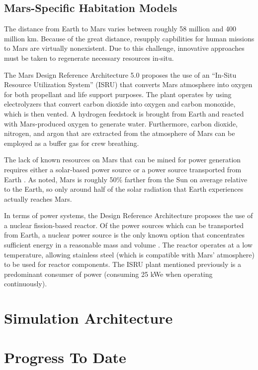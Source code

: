 \documentclass[12pt]{article}
\begin{document}
\subsection{Mars-Specific Habitation Models}

The distance from Earth to Mars varies between roughly 58 million and 400
million km. Because of the great distance, resupply capbilities for human
missions to Mars are virtually nonexistent. Due to this challenge, innovative
approaches must be taken to regenerate necessary resources in-situ.

The Mars Design Reference Architecture 5.0 \cite{drake2010human} proposes
the use of an ``In-Situ Resource Utilization System'' (ISRU) that converts Mars
atmosphere into oxygen for both propellant and life support purposes. The plant
operates by using electrolyzers that convert carbon dioxide into oxygen and
carbon monoxide, which is then vented. A hydrogen feedstock is brought from
Earth and reacted with Mars-produced oxygen to generate water. Furthermore,
carbon dioxide, nitrogen, and argon that are extracted from the atmosphere of
Mars can be employed as a buffer gas for crew breathing.

The lack of known resources on Mars that can be mined for power generation
requires either a solar-based power source or a power source transported from
Earth \cite{hoffman1997human}. As noted, Mars is roughly 50\% farther from the
Sun on average relative to the Earth, so only around half of the solar
radiation that Earth experiences actually reaches Mars.

In terms of power systems, the Design Reference Architecture
\cite{drake2010human} proposes the use of a nuclear fission-based reactor. Of
the power sources which can be transported from Earth, a nuclear power source
is the only known option that concentrates sufficient energy in a reasonable
mass and volume \cite{hoffman1997human}. The reactor operates at a low
temperature, allowing stainless steel (which is compatible with Mars'
atmosphere) to be used for reactor components. The ISRU plant mentioned
previously is a predominant consumer of power (consuming 25 kWe when operating
continuously).



\section{Simulation Architecture}
\label{sec:architecture}

\section{Progress To Date}
\label{sec:progress}
\end{document}
